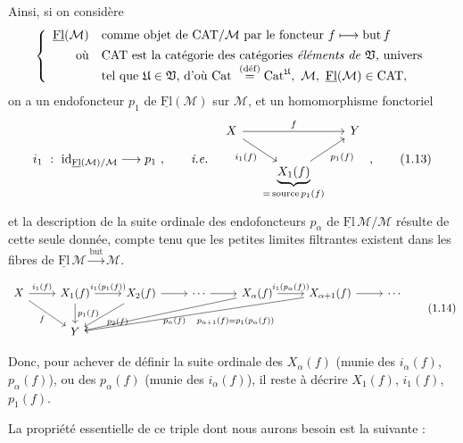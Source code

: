 \documentclass[11pt]{article}
\newcommand{\printedpage}[1]{\marginpar{\footnotesize p.~#1}}
\newcommand{\msp}[1]{\marginpar{\footnotesize [#1]}}
\newcommand{\cM}{\mathcal{M}}
\newcommand{\Flu}{\underline{\mathrm{Fl}}}
\newcommand{\fU}{\mathfrak{U}}
\newcommand{\fV}{\mathfrak{V}}
\begin{document}
\printedpage{4}

Ainsi, si on considère
\[
\left\{
\begin{array}{rl}
\Flu(\cM) & \text{comme objet de CAT}/\cM \text{ par le foncteur } f \longmapsto \text{but}\, f\\[1ex]
\text{où} & \text{CAT est la catégorie des catégories \textit{éléments de} } \fV\text{\textit{,} univers}\\
 & \text{tel que } \fU \in \fV\text{, d'où Cat } \overset{\text{(déf)}}{=} \mathrm{Cat}^{\fU},\ \cM,\ \Flu(\cM) \in \text{CAT} ,
\end{array}
\right.
\]
on a un endofoncteur $p_1$ de $\Flu(\cM)$ sur $\cM$, et un homomorphisme fonctoriel
\[
i_1 \ : \ \mathrm{id}_{\Flu(\cM)/\cM} \longrightarrow p_1 \ , \qquad \textit{i.e.} \quad
\begin{tikzcd}[column sep=small]
X \arrow[rr, "f"] \arrow[dr, "i_1(f)"'] & & Y \\
 & \underbrace{X_1(f)}_{=\,\text{source}\, p_1(f)} \arrow[ur, "p_1(f)"'] &
\end{tikzcd} \ ,
\tag*{(1.13)}
\]
et la description de la suite ordinale des endofoncteurs $p_\alpha$ de $\Flu\,\cM/\cM$ résulte de cette seule donnée, compte tenu que les petites limites filtrantes existent dans les fibres de $\Flu\,\cM \xrightarrow{\text{but}} \cM$.

\msp{page 5}

\[
\begin{tikzcd}[column sep=normal]
X \arrow[r, "i_1(f)"] \arrow[dr, "f"'] & X_1(f) \arrow[r, "i_1(p_1(f))"] \arrow[d, "p_1(f)"] & X_2(f) \arrow[r] \arrow[dl, "p_2(f)"] & \cdots \arrow[r] & X_\alpha(f) \arrow[r, "i_1(p_\alpha(f))"] \arrow[dlll, "p_\alpha(f)"] & X_{\alpha+1}(f) \arrow[r] \arrow[dllll, "p_{\alpha+1}(f) = p_1(p_\alpha(f))"] & \cdots \\
 & Y & & & & &
\end{tikzcd}
\tag*{(1.14)}
\]

Donc, pour achever de définir la suite ordinale des $X_\alpha(f)$ (munie des $i_\alpha(f)$, $p_\alpha(f)$), ou des $p_\alpha(f)$ (munie des $i_\alpha(f)$), il reste à décrire $X_1(f)$, $i_1(f)$, $p_1(f)$.

La propriété essentielle de ce triple dont nous aurons besoin est la suivante :
\end{document}
